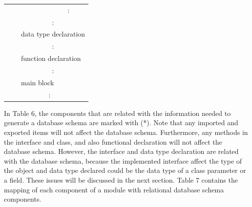 \documentclass[runningheads,a4paper]{llncs}
\begin{document}
\begin{table}[]
\begin{tabular}{|l|l|l|l|l|}
		&                          &                            & \multicolumn{2}{c|}{:}                     \\ \cline{3-5} 
		&                          & \multicolumn{3}{c|}{:}                                                  \\ \cline{3-5} 
		&                          & \multicolumn{3}{l|}{data type declaration}                              \\ \cline{3-5} 
		&                          & \multicolumn{3}{c|}{:}                                                  \\ \cline{3-5} 
		&                          & \multicolumn{3}{l|}{function declaration}                               \\ \cline{3-5} 
		&                          & \multicolumn{3}{c|}{:}                                                  \\ \cline{3-5} 
		&                          & \multicolumn{3}{l|}{main block}                                         \\ \cline{2-5} 
		& \multicolumn{4}{c|}{:}                                                                             \\ \hline
	\end{tabular}
\end{table}

In Table 6, the components that are related with the information needed to generate a database schema are marked with (*). Note that any imported and exported items will not affect the database schema. Furthermore, any methods in the interface and class, and also functional declaration will not affect the database schema. However, the interface and data type declaration are related with the database schema, because the implemented interface affect the type of the object and data type declared could be the data type of a class parameter or a field. These issues will be discussed in the next section. Table 7 contains the mapping of each component of a module with relational database schema components.
\end{document}
